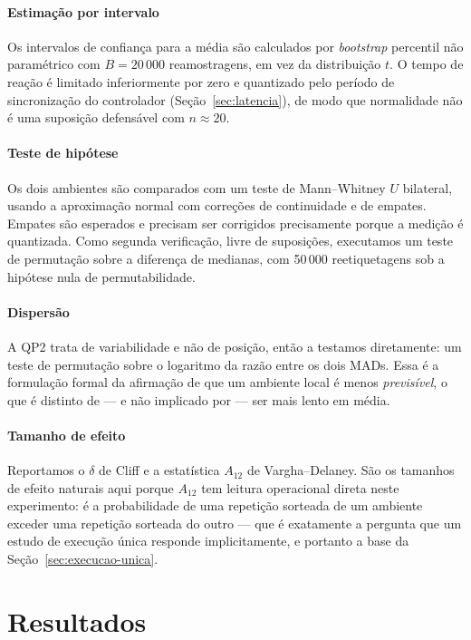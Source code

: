 \documentclass[conference]{IEEEtran}
\begin{document}
\paragraph{Estimação por intervalo} Os intervalos de confiança para a média são
calculados por \emph{bootstrap} percentil não paramétrico com $B = 20\,000$
reamostragens, em vez da distribuição $t$. O tempo de reação é limitado
inferiormente por zero e quantizado pelo período de sincronização do controlador
(Seção~\ref{sec:latencia}), de modo que normalidade não é uma suposição
defensável com $n \approx 20$.

\paragraph{Teste de hipótese} Os dois ambientes são comparados com um teste de
Mann--Whitney $U$ bilateral, usando a aproximação normal com correções de
continuidade e de empates. Empates são esperados e precisam ser corrigidos
precisamente porque a medição é quantizada. Como segunda verificação, livre de
suposições, executamos um teste de permutação sobre a diferença de medianas, com
50\,000 reetiquetagens sob a hipótese nula de permutabilidade.

\paragraph{Dispersão} A QP2 trata de variabilidade e não de posição, então a
testamos diretamente: um teste de permutação sobre o logaritmo da razão entre os
dois MADs. Essa é a formulação formal da afirmação de que um ambiente local é
menos \emph{previsível}, o que é distinto de --- e não implicado por --- ser mais
lento em média.

\paragraph{Tamanho de efeito} Reportamos o $\delta$ de Cliff e a estatística
$A_{12}$ de Vargha--Delaney. São os tamanhos de efeito naturais aqui porque
$A_{12}$ tem leitura operacional direta neste experimento: é a probabilidade de
uma repetição sorteada de um ambiente exceder uma repetição sorteada do outro ---
que é exatamente a pergunta que um estudo de execução única responde
implicitamente, e portanto a base da Seção~\ref{sec:execucao-unica}.

\section{Resultados}
\label{sec:resultados}
\end{document}
